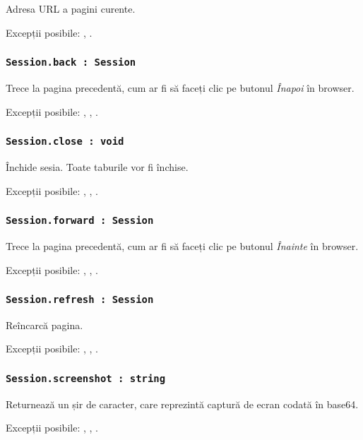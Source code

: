 Adresa URL a pagini curente.

Excepții posibile: , .

\subsubsection{\lstinline|Session.back : Session|}

Trece la pagina precedentă, cum ar fi să faceți clic pe butonul \textit{Înapoi} în browser.

Excepții posibile: , , .

\subsubsection{\lstinline|Session.close : void|}

Închide sesia. Toate taburile vor fi închise.

Excepții posibile: , , .

\subsubsection{\lstinline|Session.forward : Session|}

Trece la pagina precedentă, cum ar fi să faceți clic pe butonul \textit{Înainte} în browser.

Excepții posibile: , , .

\subsubsection{\lstinline|Session.refresh : Session|}

Reîncarcă pagina.

Excepții posibile: , , .

\subsubsection{\lstinline|Session.screenshot : string|}

Returnează un șir de caracter, care reprezintă captură de ecran codată în base64.

Excepții posibile: , , .

